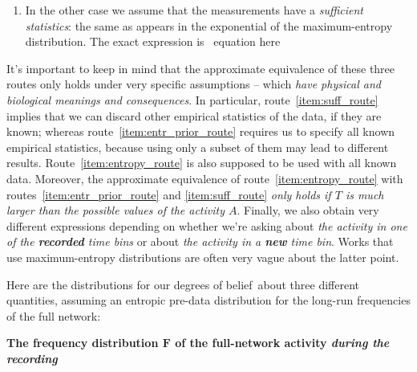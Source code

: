 \documentclass[\ifafour a4paper,12pt,\else a5paper,10pt,\fi%
onecolumn,oneside,article,%
british%
]{memoir}
\makeatletter
\theoremstyle{remark}
\theoremstyle{innote}
\def\sum{\DOTSI\sumop\slimits@}
\def\prod{\DOTSI\prodop\slimits@}
\newcommand*{\delt}{\deltaup}%
\newcommand*{\di}{\mathrm{d}}%
\newcommand*{\pf}{\mathrm{p}}%
\newcommand*{\p}{\mathrm{P}}%
\renewcommand*{\|}{\nonscript\,\vert\nonscript\;\mathopen{}}
\newcommand*{\tprod}{\mathop{\textstyle\prod}\nolimits}
\newcommand*{\tsum}{\mathop{\textstyle\sum}\nolimits}
\newcommand*{\puzzle}{{\fontencoding{U}\fontfamily{fontawesometwo}\selectfont\symbol{225}}}
\newcommand{\mynote}[1]{ {\color{notecolour}\puzzle\ #1}}
\newcommand*{\dobs}{degrees of belief}
\newcommand*{\yAv}{A}
\newcommand*{\yav}{a}
\newcommand*{\yFF}{F}
\newcommand*{\yff}{f}
\newcommand*{\yF}{\bm{\yFF}}
\newcommand*{\yf}{\bm{\yff}}
\newcommand*{\yaa}{\bm{\yav}}%
\newcommand*{\yA}{\yAv}%
\newcommand*{\yl}{\bm{l}}
\newcommand*{\yk}{z}
\makeatother
\begin{document}
\begin{enumerate}[wide,label=(\alph*)]
\item \label{item:suff_route}In the other case we assume that the
  measurements have a \emph{sufficient statistics}: the same as appears in
  the exponential of the maximum-entropy distribution. The exact expression is\mynote{equation here}
\end{enumerate}

It's important to keep in mind that the approximate equivalence of these
three routes only holds under very specific assumptions -- which \emph{have
  physical and biological meanings and consequences}. In particular,
route~\ref{item:suff_route} implies that we can discard other empirical
statistics of the data, if they are known; whereas
route~\ref{item:entr_prior_route} requires us to specify all known
empirical statistics, because using only a subset of them may lead to
different results. Route~\ref{item:entropy_route} is also supposed to be
used with all known data. Moreover, the approximate equivalence of
route~\ref{item:entropy_route} with routes~\ref{item:entr_prior_route} and
\ref{item:suff_route} \emph{only holds if $T$ is much larger than the
  possible values of the activity $\yA$}. Finally, we also obtain very
different expressions depending on whether we're asking about \emph{the
  activity in one of the \textbf{recorded} time bins} or about \emph{the
  activity in a \textbf{new} time bin}. Works that use maximum-entropy
distributions are often very vague about the latter point.


\bigskip

Here are the distributions for our \dobs\ about three different quantities,
assuming an entropic pre-data distribution for the long-run frequencies of
the full network:

\textbf{The frequency distribution $\yF$ of the full-network activity
  \emph{during the recording}}
\end{document}
